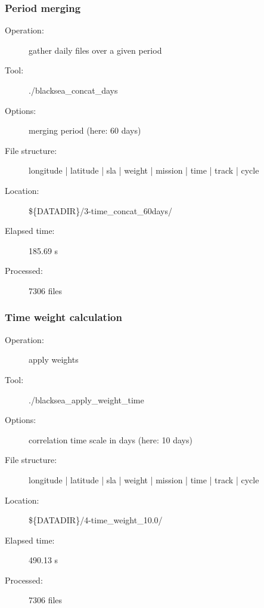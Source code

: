 \begin{frame}
\frametitle{Period merging}
\footnotesize
\begin{description}
\item[Operation:] gather daily files over a given period
\item[Tool:] ./blacksea\_concat\_days
\item[Options:] merging period (here: 60 days)
\item[File structure:] longitude | latitude | sla | weight | mission | time | track | cycle
\item[Location:] \$\{DATADIR\}/3-time\_concat\_60days/
\item[Elapsed time:] 185.69 s
\item[Processed:]  7306 files
\end{description}
\end{frame}

\begin{frame}
\frametitle{Time weight calculation}
\footnotesize
\begin{description}
\item[Operation:] apply weights
\item[Tool:] ./blacksea\_apply\_weight\_time
\item[Options:] correlation time scale in days (here: 10 days)
\item[File structure:] longitude | latitude | sla | weight | mission | time | track | cycle
\item[Location:] \$\{DATADIR\}/4-time\_weight\_10.0/
\item[Elapsed time:]  490.13 s
\item[Processed:] 7306 files
\end{description}
\end{frame}


